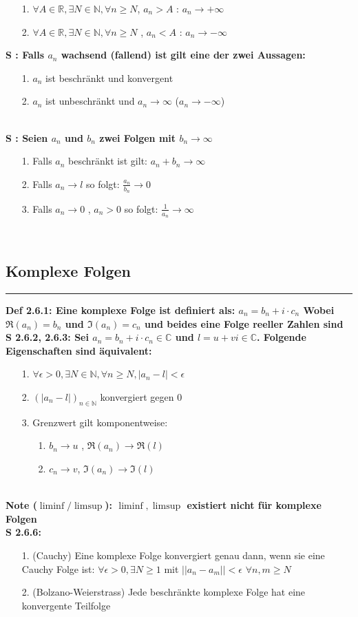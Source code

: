 \documentclass[7pt,landscape, margin = 0.1mm]{article}
\newcommand*{\mysubsection}[1]{\vspace{-2mm}\color{chaptercolor}\subsection{ #1 }
\vspace{-1mm}\hrule\vspace{1.5mm}\color{black}
\vspace{2mm}}
\newcommand{\DEF}[2]{\color{chaptercolor}\bf{Def #1}:\color{black}    \hspace{0.2cm} #2 \\}
\newcommand{\NOTE}[2]{\color{chaptercolor}\bf{Note #1}:\color{black}    \hspace{0.2cm} #2 \\}
\newcommand{\SA}[2]{\color{chaptercolor}\bf{S #1}:\color{black}    \hspace{0.2cm} #2 \\}
\begin{document}
\begin{multicols}{4}
\begin{flushleft}
{\begin{itemize}
\item[1.]$\forall A \in \mathbb{R} , \exists N \in \mathbb{N}, \forall n \geq N$, $a_n > A$ : $a_n \to + \infty$
\item[2.]$\forall A \in \mathbb{R} , \exists N \in \mathbb{N}, \forall n \geq N$ , $a_n < A$ : $a_n \to - \infty$
\end{itemize} }
\SA{}{ Falls $a_n$ wachsend (fallend) ist gilt eine der zwei Aussagen:
\begin{itemize}
\item[1.] $a_n$ ist beschränkt und konvergent
\item[2.] $a_n$ ist unbeschränkt und $a_n \to \infty$ ($a_n \to -\infty$)
\end{itemize}  }
\SA{}{ Seien $a_n$ und $b_n$ zwei Folgen mit $b_n \to \infty$
\begin{itemize}
\item[1.]  Falls $a_n$ beschränkt ist gilt: $a_n + b_n \to \infty$
\item[2.] Falls $a_n \to l$ so folgt: $\frac{a_n}{b_n} \to 0$
\item[3.] Falls $a_n \to 0$ , $a_n > 0$ so folgt: $\frac{1}{a_n} \to \infty$
\end{itemize}
 }
\mysubsection{Komplexe Folgen}
\DEF{2.6.1}{Eine komplexe Folge ist definiert als:
$ a_n = b_n + i \cdot c_n $
Wobei $\Re(a_n) = b_n$ und $\Im(a_n) = c_n$ und beides eine Folge reeller Zahlen sind}
\SA{2.6.2, 2.6.3}{Sei $a_n = b_n + i \cdot c_n \in \mathbb{C}$ und $l = u + vi \in \mathbb{C}$. Folgende Eigenschaften sind äquivalent:
\begin{itemize}
\item[1.] $\forall \epsilon > 0, \exists N \in \mathbb{N}, \forall n \geq N, |a_n-l|< \epsilon$
\item[2.] $(|a_n - l|)_{n \in \mathbb{N}}$ konvergiert gegen 0
\item[3.] Grenzwert gilt komponentweise:
\begin{itemize}
\item[1.] $b_n \to u$ , $\Re(a_n) \to \Re(l)$
\item[2.] $c_n \to v$, $\Im(a_n) \to \Im(l)$
\end{itemize}

\end{itemize}
}
\NOTE{ ($\liminf/\limsup$)}{ $\liminf,\limsup$ existiert nicht für komplexe Folgen}
\SA{2.6.6}{
\begin{itemize}
\item[1.] (Cauchy) Eine komplexe Folge konvergiert genau dann, wenn sie eine Cauchy Folge ist: $\forall \epsilon > 0, \exists N \geq 1$ mit $||a_n-a_m|| < \epsilon$ $\forall n,m \geq N$
\item[2.] (Bolzano-Weierstrass) Jede beschränkte komplexe Folge hat eine konvergente Teilfolge
\end{itemize}
}


\end{flushleft}
\end{multicols}
\end{document}
